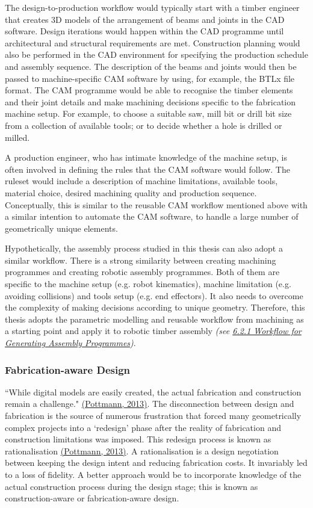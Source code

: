 \documentclass[11pt]{book}
\begin{document}
The design-to-production workflow would typically start with a timber engineer that creates 3D models of the arrangement of beams and joints in the CAD software. Design iterations would happen within the CAD programme until architectural and structural requirements are met. Construction planning would also be performed in the CAD environment for specifying the production schedule and assembly sequence. The description of the beams and joints would then be passed to machine-specific CAM software by using, for example, the BTLx file format. The CAM programme would be able to recognise the timber elements and their joint details and make machining decisions specific to the fabrication machine setup. For example, to choose a suitable saw, mill bit or drill bit size from a collection of available tools; or to decide whether a hole is drilled or milled.

A production engineer, who has intimate knowledge of the machine setup, is often involved in defining the rules that the CAM software would follow. The ruleset would include a description of machine limitations, available tools, material choice, desired machining quality and production sequence. Conceptually, this is similar to the reusable CAM workflow mentioned above with a similar intention to automate the CAM software, to handle a large number of geometrically unique elements. 

Hypothetically, the assembly process studied in this thesis can also adopt a similar workflow. There is a strong similarity between creating machining programmes and creating robotic assembly programmes. Both of them are specific to the machine setup (e.g. robot kinematics), machine limitation (e.g. avoiding collisions) and tools setup (e.g. end effectors). It also needs to overcome the complexity of making decisions according to unique geometry. Therefore, this thesis adopts the parametric modelling and reusable workflow from machining as a starting point and apply it to robotic timber assembly \textit{(see \uline{6.2.1 Workflow for Generating Assembly Programmes})}. 

\subsubsection{Fabrication-aware Design}

``While digital models are easily created, the actual fabrication and construction remain a challenge." \href{https://www.zotero.org/google-docs/?SxQXmE}{(Pottmann, 2013)}. The disconnection between design and fabrication is the source of numerous frustration that forced many geometrically complex projects into a ‘redesign’ phase after the reality of fabrication and construction limitations was imposed. This redesign process is known as rationalisation \href{https://www.zotero.org/google-docs/?JLgsyg}{(Pottmann, 2013)}. A rationalisation is a design negotiation between keeping the design intent and reducing fabrication costs. It invariably led to a loss of fidelity. A better approach would be to incorporate knowledge of the actual construction process during the design stage; this is known as construction-aware or fabrication-aware design.
\end{document}
